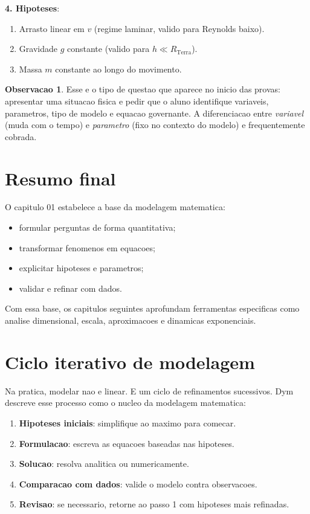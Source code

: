 \documentclass[12pt,a4paper,oneside]{book}
\theoremstyle{definition}
\newtheorem{remark}[definition]{Observacao}
\begin{document}
\textbf{4. Hipoteses}:
\begin{enumerate}
    \item Arrasto linear em $v$ (regime laminar, valido para Reynolds baixo).
    \item Gravidade $g$ constante (valido para $h \ll R_{\text{Terra}}$).
    \item Massa $m$ constante ao longo do movimento.
\end{enumerate}

\begin{remark}
Esse e o tipo de questao que aparece no inicio das provas: apresentar uma situacao
fisica e pedir que o aluno identifique variaveis, parametros, tipo de modelo e
equacao governante. A diferenciacao entre \emph{variavel} (muda com o tempo) e
\emph{parametro} (fixo no contexto do modelo) e frequentemente cobrada.
\end{remark}

\section{Resumo final}

O capitulo 01 estabelece a base da modelagem matematica:
\begin{itemize}
    \item formular perguntas de forma quantitativa;
    \item transformar fenomenos em equacoes;
    \item explicitar hipoteses e parametros;
    \item validar e refinar com dados.
\end{itemize}

Com essa base, os capitulos seguintes aprofundam ferramentas especificas como analise dimensional, escala, aproximacoes e dinamicas exponenciais.

\section{Ciclo iterativo de modelagem}

Na pratica, modelar nao e linear. E um ciclo de refinamentos sucessivos.
Dym descreve esse processo como o nucleo da modelagem matematica:

\begin{enumerate}
    \item \textbf{Hipoteses iniciais}: simplifique ao maximo para comecar.
    \item \textbf{Formulacao}: escreva as equacoes baseadas nas hipoteses.
    \item \textbf{Solucao}: resolva analitica ou numericamente.
    \item \textbf{Comparacao com dados}: valide o modelo contra observacoes.
    \item \textbf{Revisao}: se necessario, retorne ao passo 1 com hipoteses mais refinadas.
\end{enumerate}
\end{document}
